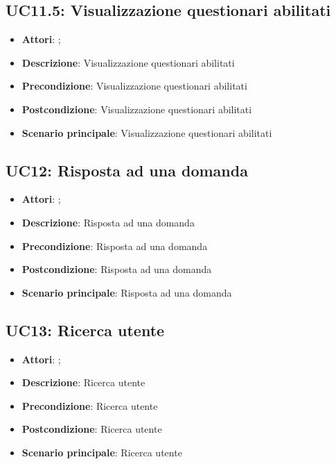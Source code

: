 \subsection{UC11.5: Visualizzazione questionari abilitati}
\label{UC11.5}
\begin{itemize}
\item \textbf{Attori}: ;
\item \textbf{Descrizione}: Visualizzazione questionari abilitati
\item \textbf{Precondizione}: Visualizzazione questionari abilitati
\item \textbf{Postcondizione}: Visualizzazione questionari abilitati
\item \textbf{Scenario principale}:
Visualizzazione questionari abilitati
\end{itemize}

\subsection{UC12: Risposta ad una domanda}
\label{UC12}
\begin{itemize}
\item \textbf{Attori}: ;
\item \textbf{Descrizione}: Risposta ad una domanda
\item \textbf{Precondizione}: Risposta ad una domanda
\item \textbf{Postcondizione}: Risposta ad una domanda
\item \textbf{Scenario principale}:
Risposta ad una domanda
\end{itemize}

\subsection{UC13: Ricerca utente}
\label{UC13}
\begin{itemize}
\item \textbf{Attori}: ;
\item \textbf{Descrizione}: Ricerca utente
\item \textbf{Precondizione}: Ricerca utente
\item \textbf{Postcondizione}: Ricerca utente
\item \textbf{Scenario principale}:
Ricerca utente
\end{itemize}

